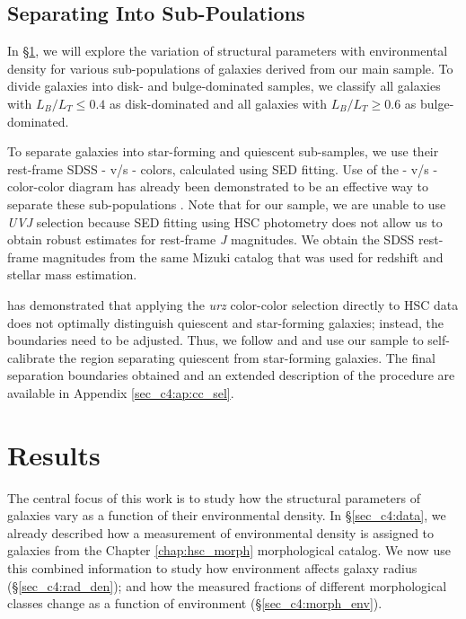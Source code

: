 \subsection{Separating Into Sub-Poulations} \label{sec_c4:sep_into_subsamples}
In \S \ref{sec_c4:results}, we will explore the variation of structural parameters with environmental density for various sub-populations of galaxies derived from our main sample. To divide galaxies into disk- and bulge-dominated samples, we classify all galaxies with $L_B/L_T \leq 0.4$ as disk-dominated and all galaxies with $L_B/L_T \geq 0.6$ as bulge-dominated. 

To separate galaxies into star-forming and quiescent sub-samples, we use their rest-frame SDSS \uband{}-\rb{} v/s \rb{}-\zb{} colors, calculated using SED fitting. Use of the \uband{}-\rb{} v/s \rb{}-\zb{} color-color diagram has already been demonstrated to be an effective way to separate these sub-populations \citep[e.g.,][]{Holden12, Chang15, pozzetti_10, lopes_16, hsc_mass_size}. Note that for our sample, we are unable to use \textit{UVJ} selection because SED fitting using HSC \grizy{} photometry does not allow us to obtain robust estimates for rest-frame \textit{J} magnitudes. We obtain the SDSS rest-frame magnitudes from the same Mizuki catalog that was used for redshift and stellar mass estimation. 

\citet{hsc_mass_size} has demonstrated that applying the \citet{Holden12} \textit{urz} color-color selection directly to HSC data does not optimally distinguish quiescent and star-forming galaxies; instead, the boundaries need to be adjusted. Thus, we follow \citet{Kawin16} and \citet{hsc_mass_size} and use our sample to self-calibrate the region separating quiescent from star-forming galaxies. The final separation boundaries obtained and an extended description of the procedure are available in Appendix \ref{sec_c4:ap:cc_sel}.

\section{Results} \label{sec_c4:results}
The central focus of this work is to study how the structural parameters of galaxies vary as a function of their environmental density. In \S \ref{sec_c4:data}, we already described how a measurement of environmental density is assigned to galaxies from the Chapter \ref{chap:hsc_morph} morphological catalog. We now use this combined information to study how environment affects galaxy radius (\S \ref{sec_c4:rad_den}); and how the measured fractions of different morphological classes change as a function of environment (\S \ref{sec_c4:morph_env}).

